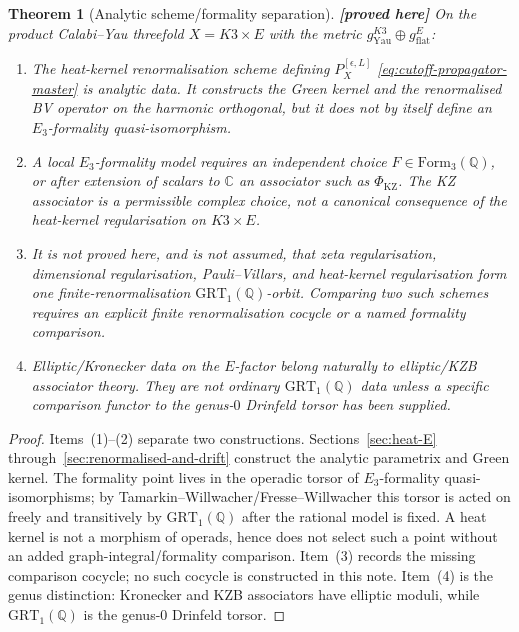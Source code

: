 \documentclass[11pt]{amsart}
\providecommand{\ClaimStatusProvedHere}[1][]{\textbf{[proved here]}}
\providecommand{\C}{\mathbb{C}}
\providecommand{\Q}{\mathbb{Q}}
\providecommand{\GRT}{\mathrm{GRT}}
\newtheorem{theorem}{Theorem}[section]
\theoremstyle{definition}
\theoremstyle{remark}
\begin{document}
\begin{theorem}[Analytic scheme/formality separation]
\label{thm:scheme-associator}
\ClaimStatusProvedHere
On the product Calabi--Yau threefold $X = K3 \times E$ with the
metric $g_{\mathrm{Yau}}^{K3} \oplus g_{\mathrm{flat}}^E$:
\begin{enumerate}[label=\textup{(\arabic*)}]
\item The heat-kernel renormalisation scheme defining $P_X^{[\epsilon,L]}$
\eqref{eq:cutoff-propagator-master} is analytic data. It constructs
the Green kernel and the renormalised BV operator on the harmonic
orthogonal, but it does not by itself define an $E_3$-formality
quasi-isomorphism.
\item A local $E_3$-formality model requires an independent choice
$F\in\mathrm{Form}_3(\Q)$, or after extension of scalars to $\C$ an
associator such as $\Phi_{\mathrm{KZ}}$. The KZ associator is a
permissible complex choice, not a canonical consequence of the
heat-kernel regularisation on $K3\times E$.
\item It is not proved here, and is not assumed, that zeta
regularisation, dimensional regularisation, Pauli--Villars, and
heat-kernel regularisation form one finite-renormalisation
$\GRT_1(\Q)$-orbit. Comparing two such schemes requires an explicit
finite renormalisation cocycle or a named formality comparison.
\item Elliptic/Kronecker data on the $E$-factor belong naturally to
elliptic/KZB associator theory. They are not ordinary
$\GRT_1(\Q)$ data unless a specific comparison functor to the
genus-$0$ Drinfeld torsor has been supplied.
\end{enumerate}
\end{theorem}

\begin{proof}
Items~(1)--(2) separate two constructions. Sections~\ref{sec:heat-E}
through~\ref{sec:renormalised-and-drift} construct the analytic
parametrix and Green kernel. The formality point lives in the
operadic torsor of $E_3$-formality quasi-isomorphisms; by
Tamarkin--Willwacher/Fresse--Willwacher this torsor is acted on
freely and transitively by $\GRT_1(\Q)$ after the rational model is
fixed. A heat kernel is not a morphism of operads, hence does not
select such a point without an added graph-integral/formality
comparison. Item~(3) records the missing comparison cocycle; no such
cocycle is constructed in this note. Item~(4) is the genus distinction:
Kronecker and KZB associators have elliptic moduli, while
$\GRT_1(\Q)$ is the genus-$0$ Drinfeld torsor.
\end{proof}
\end{document}
